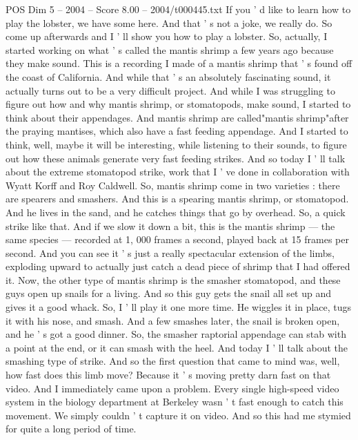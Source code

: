 \begin{textsample}{POS Dim 5 – 2004 – Score 8.00 – 2004/t000445.txt}  \label{ex:f5_pos_017}
If you ' d like to learn how to play the lobster, we have some here.
And that ' s not a joke, we really do.
So come up afterwards and I ' ll show you how to play a lobster.
So, actually, I started working on what ' s called the mantis shrimp a few years ago because they make sound.
This is a recording I made of a mantis shrimp that ' s found off the coast of California.
And while that ' s an absolutely fascinating sound, it actually turns out to be a very difficult project.
And while I was struggling to figure out how and why mantis shrimp, or stomatopods, make sound, I started to think about their appendages.
And mantis shrimp are called"mantis shrimp"after the praying mantises, which also have a fast feeding appendage.
And I started to think, well, maybe it will be interesting, while listening to their sounds, to figure out how these animals generate very fast feeding strikes.
And so today I ' ll talk about the extreme stomatopod strike, work that I ' ve done in collaboration with Wyatt Korff and Roy Caldwell.
So, mantis shrimp come in two varieties : there are spearers and smashers.
And this is a spearing mantis shrimp, or stomatopod.
And he lives in the sand, and he catches things that go by overhead.
So, a quick strike like that.
And if we slow it down a bit, this is the mantis shrimp — the same species — recorded at 1, 000 frames a second, played back at 15 frames per second.
And you can see it ' s just a really spectacular extension of the limbs, exploding upward to actually just catch a dead piece of shrimp that I had offered it.
Now, the other type of mantis shrimp is the smasher stomatopod, and these guys open up snails for a living.
And so this guy gets the snail all set up and gives it a good whack.
So, I ' ll play it one more time.
He wiggles it in place, tugs it with his nose, and smash.
And a few smashes later, the snail is broken open, and he ' s got a good dinner.
So, the smasher raptorial appendage can stab with a point at the end, or it can smash with the heel.
And today I ' ll talk about the smashing type of strike.
And so the first question that came to mind was, well, how fast does this limb move?
Because it ' s moving pretty darn fast on that video.
And I immediately came upon a problem.
Every single high-speed video system in the biology department at Berkeley wasn ' t fast enough to catch this movement.
We simply couldn ' t capture it on video.
And so this had me stymied for quite a long period of time.

\end{textsample}
